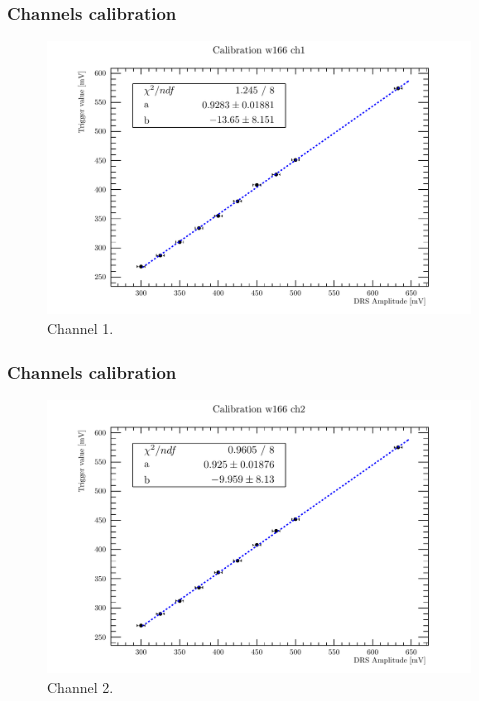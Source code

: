 \documentclass[9pt]{beamer}
\begin{document}

\begin{frame} [fragile]
\small
	\frametitle{Channels calibration}
    		\begin{figure}
		 \centering
			\includegraphics[scale=0.5]{figures/ch1.pdf}
			\caption{Channel 1.}
		\end{figure}  
\end{frame}


\begin{frame} [fragile]
\small
	\frametitle{Channels calibration}
    		\begin{figure}
		 \centering
			\includegraphics[scale=0.5]{figures/ch2.pdf}
			\caption{Channel 2.}
		\end{figure}  
\end{frame}
\end{document}
